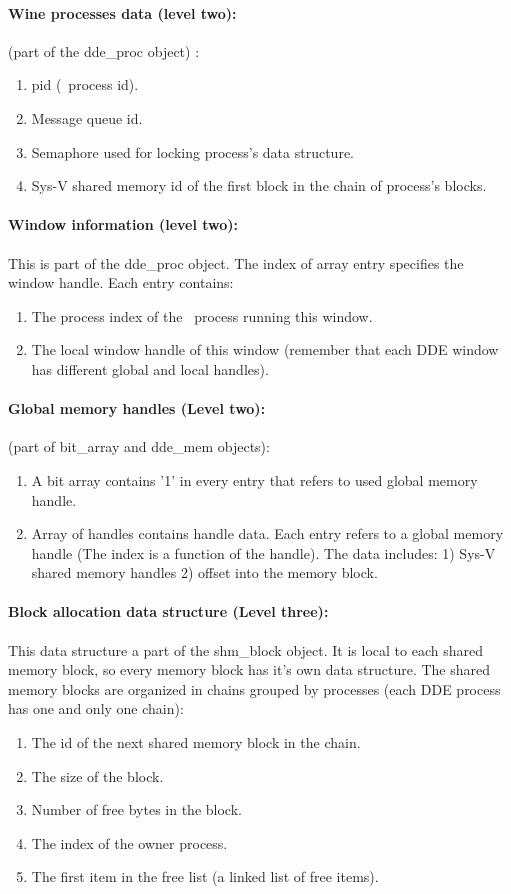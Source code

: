 \paragraph{Wine processes data (level two):}
(part of the dde\_proc object) :
\begin{enumerate}
  \item pid (\Wine\ process id).
  \item Message queue id.
  \item Semaphore used for locking process's data structure.
  \item Sys-V shared memory id of the first block in the chain of
    process's blocks.
\end{enumerate}


\paragraph{Window information (level two):}
This is part of the dde\_proc object. The index of array entry
specifies the window handle. Each entry contains:
\begin{enumerate}
  \item The process index of the \Wine\ process running this window.
  \item The local window handle of this window (remember that each DDE
    window has different global and local handles).
\end{enumerate}


\paragraph{Global memory handles (Level two):}
(part of bit\_array and dde\_mem objects):
\begin{enumerate}
  \item A bit array contains '1' in every entry that refers to
    used global memory handle.
  \item Array of handles contains handle data. Each entry refers
    to a global memory handle (The index is a function of the
    handle).  The data includes: 1) Sys-V shared memory handles 2)
    offset into the memory block. 
\end{enumerate}

\paragraph{Block allocation data structure (Level three):}
This data structure a part of the shm\_block object. It is local to
each shared memory block, so every memory block has it's own data
structure. The shared memory blocks are organized in chains grouped by
processes (each DDE process has one and only one chain): 
\begin{enumerate}
  \item The id of the next shared memory block in the chain.
  \item The size of the block.
  \item Number of free bytes in the block.
  \item The index of the owner process.
  \item The first item in the free list (a linked list of free items).
\end{enumerate}


